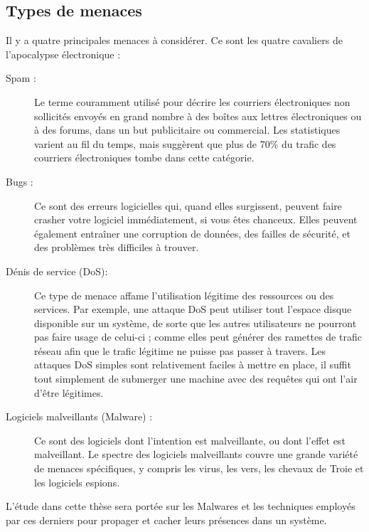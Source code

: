     \subsection{Types de menaces}
    Il y a quatre principales menaces à considérer. Ce sont les quatre cavaliers de l'apocalypse électronique :%
    \begin{description}
        \item[Spam :] Le terme couramment utilisé pour décrire les courriers électroniques non sollicités envoyés 
            en grand nombre à des boîtes aux lettres électroniques ou à des forums, dans un but publicitaire 
            ou commercial. Les statistiques varient au fil du temps, mais suggèrent que plus de 
            70\% du trafic des courriers électroniques tombe dans cette catégorie.%
        \item[Bugs :] Ce sont des erreurs logicielles qui, quand elles surgissent, peuvent faire crasher votre 
            logiciel immédiatement, si vous êtes chanceux. Elles peuvent également entraîner une corruption de données,
            des failles de sécurité, et des problèmes très difficiles à trouver. \cite{virus} %
        \item[Dénis de service (DoS):] Ce type de menace affame l'utilisation légitime des ressources ou des 
            services. Par exemple, une attaque DoS peut utiliser tout l'espace disque disponible sur un 
            système, de sorte que les autres utilisateurs ne pourront pas faire usage de celui-ci ; comme elles
            peut générer des ramettes de trafic réseau afin que le trafic légitime ne puisse pas passer à travers.
            Les attaques DoS simples sont relativement faciles à mettre en place, il suffit tout simplement 
            de submerger une machine avec des requêtes qui ont l'air d'être légitimes. \cite{virus} %
        \item[Logiciels malveillants (Malware) :] Ce sont des logiciels dont l'intention est malveillante, 
            ou dont l'effet est malveillant. Le spectre des logiciels malveillants couvre une grande variété 
            de menaces spécifiques, y compris les virus, les vers, les chevaux de Troie et les logiciels espions.
            \cite{virus}%
    \end{description}

    L'étude dans cette thèse sera portée sur les Malwares et les techniques employés par ces derniers pour propager
    et cacher leurs présences dans un système. %

